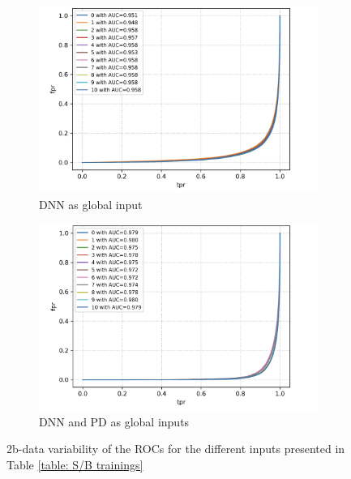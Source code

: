 \begin{figure}[hbt]
\centering
\begin{subfigure}{.5\textwidth}
  \centering
  \includegraphics[width=1.1\linewidth]{Images/7.S_B/Variability/2b data DNN.png}
  \caption{DNN as global input}
  \label{fig: 2b data DNN}
\end{subfigure}%
\begin{subfigure}{.5\textwidth}
  \centering
  \includegraphics[width=1.1\linewidth]{Images/7.S_B/Variability/2b data DNN and prob diff.png}
  \caption{DNN and PD as global inputs}
  \label{fig: 2b data DNN PD}
\end{subfigure}
\caption{2b-data variability of the ROCs for the different inputs presented in Table \ref{table: S/B trainings}}
\label{fig: 2b data v ariability}
\end{figure}

